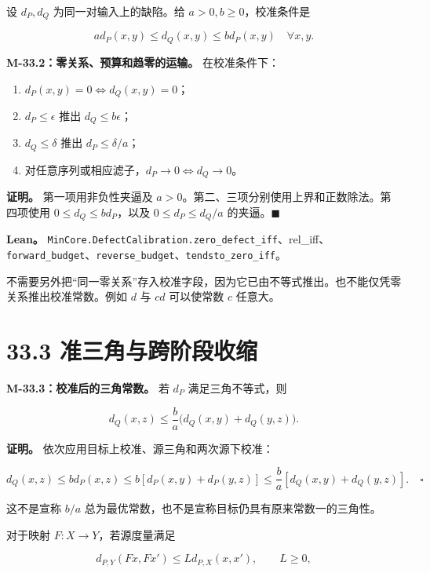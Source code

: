 \documentclass[
  11pt,
  oneside]{book}
\providecommand{\tightlist}{%
  \setlength{\itemsep}{0pt}\setlength{\parskip}{0pt}}
\begin{document}
设 \(d_P,d_Q\) 为同一对输入上的缺陷。给 \(a>0,b\ge0\)，校准条件是

\[a d_P(x,y)\le d_Q(x,y)\le b d_P(x,y)\quad\forall x,y.\]

\hypertarget{m-33-2}{}\label{m-33-2}

\textbf{M-33.2：零关系、预算和趋零的运输。} 在校准条件下：

\begin{enumerate}
\def\labelenumi{\arabic{enumi}.}
\tightlist
\item
  \(d_P(x,y)=0\iff d_Q(x,y)=0\)；
\item
  \(d_P\le\epsilon\) 推出 \(d_Q\le b\epsilon\)；
\item
  \(d_Q\le\delta\) 推出 \(d_P\le\delta/a\)；
\item
  对任意序列或相应滤子，\(d_P\to0\iff d_Q\to0\)。
\end{enumerate}

\textbf{证明。} 第一项用非负性夹逼及 \(a>0\)。第二、三项分别使用上界和正数除法。第四项使用 \(0\le d_Q\le bd_P\)，以及 \(0\le d_P\le d_Q/a\) 的夹逼。\(\blacksquare\)

\textbf{Lean。} \nolinkurl{MinCore.DefectCalibration.zero_defect_iff}、rel\_iff、\nolinkurl{forward_budget}、\nolinkurl{reverse_budget}、\nolinkurl{tendsto_zero_iff}。

不需要另外把``同一零关系''存入校准字段，因为它已由不等式推出。也不能仅凭零关系推出校准常数。例如 \(d\) 与 \(cd\) 可以使常数 \(c\) 任意大。

\section{33.3 准三角与跨阶段收缩}\label{ux51c6ux4e09ux89d2ux4e0eux8de8ux9636ux6bb5ux6536ux7f29}

\hypertarget{m-33-3}{}\label{m-33-3}

\textbf{M-33.3：校准后的三角常数。} 若 \(d_P\) 满足三角不等式，则

\[d_Q(x,z)\le\frac ba\bigl(d_Q(x,y)+d_Q(y,z)\bigr).\]

\textbf{证明。} 依次应用目标上校准、源三角和两次源下校准：

\[d_Q(x,z)\le b d_P(x,z)
\le b[d_P(x,y)+d_P(y,z)]
\le\frac ba[d_Q(x,y)+d_Q(y,z)].\quad\square\]

这不是宣称 \(b/a\) 总为最优常数，也不是宣称目标仍具有原来常数一的三角性。

对于映射 \(F:X\to Y\)，若源度量满足

\[d_{P,Y}(Fx,Fx')\le Ld_{P,X}(x,x'),\qquad L\ge0,\]
\end{document}
